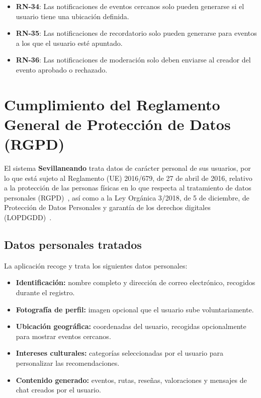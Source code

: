 \begin{itemize}
    \item \textbf{RN-34}: Las notificaciones de eventos cercanos solo pueden generarse si el usuario tiene una ubicación definida.
    \item \textbf{RN-35}: Las notificaciones de recordatorio solo pueden generarse para eventos a los que el usuario esté apuntado.
    \item \textbf{RN-36}: Las notificaciones de moderación solo deben enviarse al creador del evento aprobado o rechazado.
\end{itemize}

\section{Cumplimiento del Reglamento General de Protección de Datos (RGPD)}\label{sec:rgpd}

El sistema \textbf{Sevillaneando} trata datos de carácter personal de sus usuarios, por lo que está sujeto al Reglamento (UE) 2016/679, de 27 de abril de 2016, relativo a la protección de las personas físicas en lo que respecta al tratamiento de datos personales (RGPD)~\cite{rgpd2016}, así como a la Ley Orgánica 3/2018, de 5 de diciembre, de Protección de Datos Personales y garantía de los derechos digitales (LOPDGDD)~\cite{lopdgdd2018}.

\subsection{Datos personales tratados}

La aplicación recoge y trata los siguientes datos personales:

\begin{itemize}
    \item \textbf{Identificación:} nombre completo y dirección de correo electrónico, recogidos durante el registro.
    \item \textbf{Fotografía de perfil:} imagen opcional que el usuario sube voluntariamente.
    \item \textbf{Ubicación geográfica:} coordenadas del usuario, recogidas opcionalmente para mostrar eventos cercanos.
    \item \textbf{Intereses culturales:} categorías seleccionadas por el usuario para personalizar las recomendaciones.
    \item \textbf{Contenido generado:} eventos, rutas, reseñas, valoraciones y mensajes de chat creados por el usuario.
\end{itemize}

